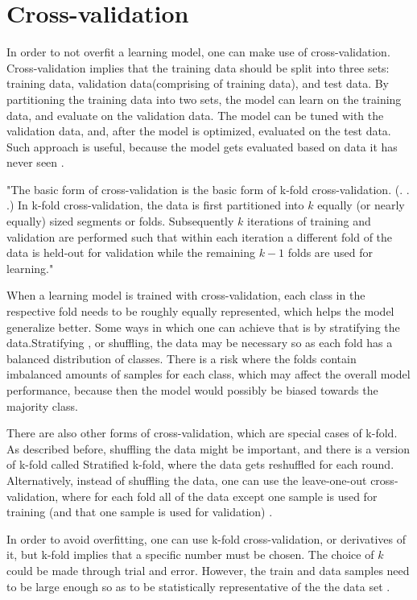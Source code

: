 \section{Cross-validation}
In order to not overfit a learning model, one can make use of cross-validation. Cross-validation implies that the training data should be split into three sets: training data, validation data(comprising of training data), and test data. By partitioning the training data into two sets, the model can learn on the training data, and evaluate on the validation data. The model can be tuned with the validation data, and, after the model is optimized, evaluated on the test data. Such approach is useful, because the model gets evaluated based on data it has never seen \cite{scikit-learn}.



"The basic form of cross-validation is the basic form of k-fold cross-validation. (. . .) In k-fold cross-validation, the data is first partitioned into $k$ equally (or nearly equally) sized segments or folds. Subsequently $k$ iterations of training and validation are performed such that within each iteration a different fold of the data is held-out for validation while the remaining $k-1$ folds are used for learning." \cite{Refaeilzadeh2009}


When a learning model is trained with cross-validation, each class in the respective fold needs to be roughly equally represented, which helps the model generalize better. Some ways in which one can achieve that is by stratifying the data.Stratifying \cite{Refaeilzadeh2009}, or shuffling, the data may be necessary so as each fold has a balanced distribution of classes. There is a risk where the folds contain imbalanced amounts of samples for each class, which may affect the overall model performance, because then the model would possibly be biased towards the majority class.

There are also other forms of cross-validation, which are special cases of k-fold. As described before, shuffling the data might be important, and there is a version of k-fold called Stratified k-fold, where the data gets reshuffled for each round. Alternatively, instead of shuffling the data, one can use the leave-one-out cross-validation, where for each fold all of the data except one sample is used for training (and that one sample is used for validation) \cite{Refaeilzadeh2009}.

In order to avoid overfitting, one can use k-fold cross-validation, or derivatives of it, but k-fold implies that a specific number must be chosen. The choice of $k$ could be made through trial and error. However, the train and data samples need to be large enough so as to be statistically representative of the the data set \cite{Refaeilzadeh2009}. 


